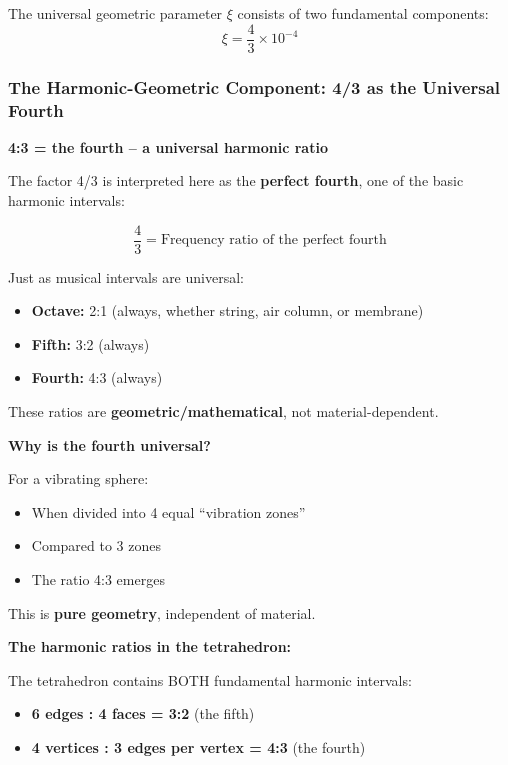 The universal geometric parameter $\xi$ consists of two fundamental components:
\begin{equation}
	\xi = \frac{4}{3} \times 10^{-4}
\end{equation}

\subsubsection{The Harmonic-Geometric Component: 4/3 as the Universal Fourth}

\textbf{4:3 = the fourth -- a universal harmonic ratio}

The factor 4/3 is interpreted here as the \textbf{perfect fourth}, one of the basic harmonic intervals:

\begin{equation}
	\frac{4}{3} = \text{Frequency ratio of the perfect fourth}
\end{equation}

Just as musical intervals are universal:
\begin{itemize}
	\item \textbf{Octave:} 2:1 (always, whether string, air column, or membrane)
	\item \textbf{Fifth:} 3:2 (always)
	\item \textbf{Fourth:} 4:3 (always)
\end{itemize}

These ratios are \textbf{geometric/mathematical}, not material-dependent.

\textbf{Why is the fourth universal?}

For a vibrating sphere:
\begin{itemize}
	\item When divided into 4 equal ``vibration zones''
	\item Compared to 3 zones
	\item The ratio 4:3 emerges
\end{itemize}

This is \textbf{pure geometry}, independent of material.

\textbf{The harmonic ratios in the tetrahedron:}

The tetrahedron contains BOTH fundamental harmonic intervals:
\begin{itemize}
	\item \textbf{6 edges : 4 faces = 3:2} (the fifth)
	\item \textbf{4 vertices : 3 edges per vertex = 4:3} (the fourth)
\end{itemize}

